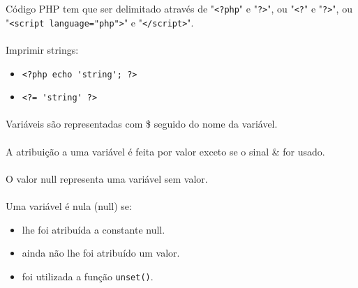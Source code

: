 \documentclass[../resumosLTW.tex]{subfiles}
\begin{document}
 

Código PHP tem que ser delimitado através de "\lstinline{<?php}" e "\lstinline{?>}", ou "\lstinline{<?}" e "\lstinline{?>}", ou "\lstinline{<script language="php">}" e "\lstinline{</script>}".

\paragraph{}

Imprimir strings:
\begin{itemize}
    \item \lstinline{<?php echo 'string'; ?>}
    \item \lstinline{<?= 'string' ?>}
\end{itemize}

\paragraph{}

Variáveis são representadas com \$ seguido do nome da variável.

\paragraph{}

A atribuição a uma variável é feita por valor exceto se o sinal \& for usado.

\paragraph{}

O valor null representa uma variável sem valor.

\paragraph{}

Uma variável é nula (null) se:
\begin{itemize}
    \item lhe foi atribuída a constante null.
    \item ainda não lhe foi atribuído um valor.
    \item foi utilizada a função \lstinline{unset()}.
\end{itemize}

\paragraph{}
\end{document}
